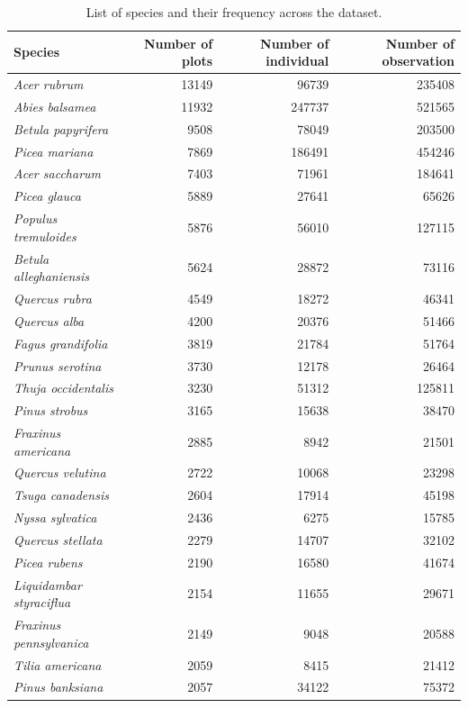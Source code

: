 \hypertarget{tbl:variability_impl_mech}{%
\begin{longtable}{lrrr}
\caption{List of species and their frequency across the dataset.}
\label{tbl:variability_impl_mech}
\endfirsthead
\endhead
  \toprule
    Species & Number of
    plots & Number of
    individual & Number of
    observation \\
    \midrule\addlinespace[2.5pt]
    \emph{Acer rubrum} & 13149 & 96739 & 235408 \\
    \emph{Abies balsamea} & 11932 & 247737 & 521565 \\
    \emph{Betula papyrifera} & 9508 & 78049 & 203500 \\
    \emph{Picea mariana} & 7869 & 186491 & 454246 \\
    \emph{Acer saccharum} & 7403 & 71961 & 184641 \\
    \emph{Picea glauca} & 5889 & 27641 & 65626 \\
    \emph{Populus tremuloides} & 5876 & 56010 & 127115 \\
    \emph{Betula alleghaniensis} & 5624 & 28872 & 73116 \\
    \emph{Quercus rubra} & 4549 & 18272 & 46341 \\
    \emph{Quercus alba} & 4200 & 20376 & 51466 \\
    \emph{Fagus grandifolia} & 3819 & 21784 & 51764 \\
    \emph{Prunus serotina} & 3730 & 12178 & 26464 \\
    \emph{Thuja occidentalis} & 3230 & 51312 & 125811 \\
    \emph{Pinus strobus} & 3165 & 15638 & 38470 \\
    \emph{Fraxinus americana} & 2885 & 8942 & 21501 \\
    \emph{Quercus velutina} & 2722 & 10068 & 23298 \\
    \emph{Tsuga canadensis} & 2604 & 17914 & 45198 \\
    \emph{Nyssa sylvatica} & 2436 & 6275 & 15785 \\
    \emph{Quercus stellata} & 2279 & 14707 & 32102 \\
    \emph{Picea rubens} & 2190 & 16580 & 41674 \\
    \emph{Liquidambar styraciflua} & 2154 & 11655 & 29671 \\
    \emph{Fraxinus pennsylvanica} & 2149 & 9048 & 20588 \\
    \emph{Tilia americana} & 2059 & 8415 & 21412 \\
    \emph{Pinus banksiana} & 2057 & 34122 & 75372 \\

\end{longtable}}
